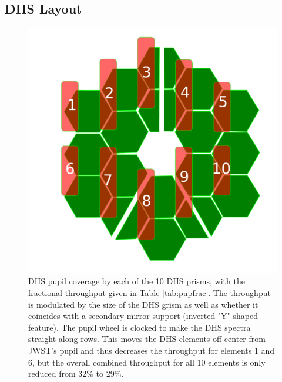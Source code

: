 \documentclass[iop]{emulateapj}
\begin{document}
\subsection{DHS Layout}\label{sec:layout}

\begin{figure}[b]
\centering
\includegraphics[width=1.0\columnwidth]{dhs_pupil_labels_modA.pdf}
\caption{DHS pupil coverage by each of the 10 DHS prisms, with the fractional throughput given in Table \ref{tab:pupfrac}. 
The throughput is modulated by the size of the DHS grism as well as whether it coincides with a secondary mirror support (inverted "Y" shaped feature).
The pupil wheel is clocked to make the DHS spectra straight along rows.
This moves the DHS elements off-center from JWST's pupil and thus decreases the throughput for elements 1 and 6, but the overall combined throughput for all 10 elements is only reduced from 32\% to 29\%.}\label{fig:DHSvsPupilOverlay}
\end{figure}
\end{document}
